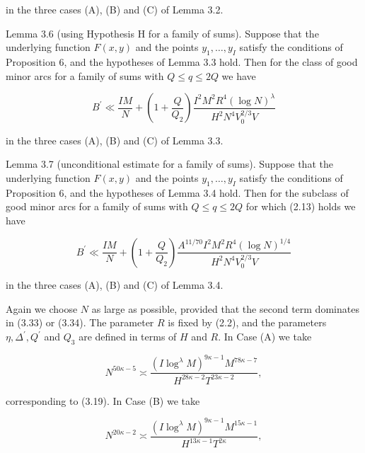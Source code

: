 \documentclass[10pt]{article}
\begin{document}
in the three cases (A), (B) and (C) of Lemma 3.2.

Lemma 3.6 (using Hypothesis H for a family of sums). Suppose that the underlying function $F(x, y)$ and the points $y_{1}, \ldots, y_{I}$ satisfy the conditions of Proposition 6, and the hypotheses of Lemma 3.3 hold. Then for the class of good minor arcs for a family of sums with $Q \leqslant q \leqslant 2 Q$ we have


\begin{equation*}
B^{\prime} \ll \frac{I M}{N}+\left(1+\frac{Q}{Q_{2}}\right) \frac{I^{2} M^{2} R^{4}(\log N)^{\lambda}}{H^{2} N^{4} V_{0}^{2 / 3} V} \tag{3.33}
\end{equation*}


in the three cases (A), (B) and (C) of Lemma 3.3.

Lemma 3.7 (unconditional estimate for a family of sums). Suppose that the underlying function $F(x, y)$ and the points $y_{1}, \ldots, y_{I}$ satisfy the conditions of Proposition 6, and the hypotheses of Lemma 3.4 hold. Then for the subclass of good minor arcs for a family of sums with $Q \leqslant q \leqslant 2 Q$ for which (2.13) holds we have


\begin{equation*}
B^{\prime} \ll \frac{I M}{N}+\left(1+\frac{Q}{Q_{2}}\right) \frac{A^{11 / 70} I^{2} M^{2} R^{4}(\log N)^{1 / 4}}{H^{2} N^{4} V_{0}^{2 / 3} V} \tag{3.34}
\end{equation*}


in the three cases (A), (B) and (C) of Lemma 3.4.

Again we choose $N$ as large as possible, provided that the second term dominates in (3.33) or (3.34). The parameter $R$ is fixed by (2.2), and the parameters $\eta, \Delta^{\prime}, Q^{\prime}$ and $Q_{3}$ are defined in terms of $H$ and $R$. In Case (A) we take


\begin{equation*}
N^{50 \kappa-5} \asymp \frac{\left(I \log ^{\lambda} M\right)^{9 \kappa-1} M^{78 \kappa-7}}{H^{28 \kappa-2} T^{23 \kappa-2}}, \tag{3.35}
\end{equation*}


corresponding to (3.19). In Case (B) we take


\begin{equation*}
N^{20 \kappa-2} \asymp \frac{\left(I \log ^{\lambda} M\right)^{9 \kappa-1} M^{15 \kappa-1}}{H^{13 \kappa-1} T^{2 \kappa}}, \tag{3.36}
\end{equation*}
\end{document}
